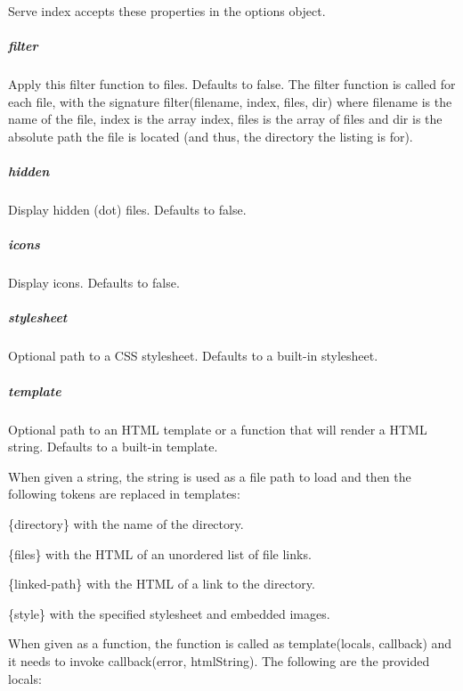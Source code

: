 Serve index accepts these properties in the options object.

\subparagraph*{filter}

Apply this filter function to files. Defaults to {\ttfamily false}. The {\ttfamily filter} function is called for each file, with the signature {\ttfamily filter(filename, index, files, dir)} where {\ttfamily filename} is the name of the file, {\ttfamily index} is the array index, {\ttfamily files} is the array of files and {\ttfamily dir} is the absolute path the file is located (and thus, the directory the listing is for).

\subparagraph*{hidden}

Display hidden (dot) files. Defaults to {\ttfamily false}.

\subparagraph*{icons}

Display icons. Defaults to {\ttfamily false}.

\subparagraph*{stylesheet}

Optional path to a C\+SS stylesheet. Defaults to a built-\/in stylesheet.

\subparagraph*{template}

Optional path to an H\+T\+ML template or a function that will render a H\+T\+ML string. Defaults to a built-\/in template.

When given a string, the string is used as a file path to load and then the following tokens are replaced in templates\+:


\begin{DoxyItemize}
\item {\ttfamily \{directory\}} with the name of the directory.
\item {\ttfamily \{files\}} with the H\+T\+ML of an unordered list of file links.
\item {\ttfamily \{linked-\/path\}} with the H\+T\+ML of a link to the directory.
\item {\ttfamily \{style\}} with the specified stylesheet and embedded images.
\end{DoxyItemize}

When given as a function, the function is called as {\ttfamily template(locals, callback)} and it needs to invoke {\ttfamily callback(error, html\+String)}. The following are the provided locals\+:


